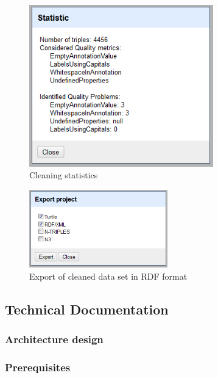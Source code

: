 \begin{figure}[ht!]
\centering
\includegraphics[width=8cm]{figures/statistics.png}
\caption{Cleaning statistics}
\label{fig:statistics}
\end{figure}


\begin{figure}[ht!]
\centering
\includegraphics[width=6cm]{figures/export.png}
\caption{Export of cleaned data set in RDF format}
\label{fig:export}
\end{figure}

\subsection{Technical Documentation}


\subsubsection{Architecture design}
\subsubsection{Prerequisites}

